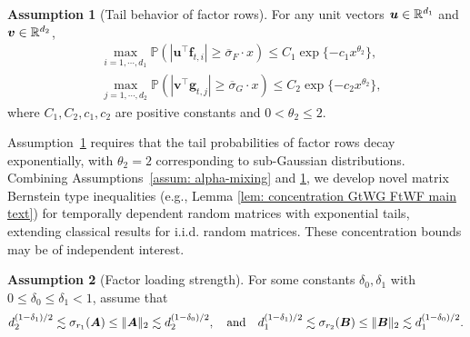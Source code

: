 \documentclass[11pt,letterpaper]{article}
\newcommand{\bfm}[1]{\ensuremath{\boldsymbol{#1}}} %
\def\bg{\bfm g}   \def\bG{\bfm G}  \def\GG{\mathbb{G}}
\def\bu{\bfm u}   \def\bU{\bfm U}  \def\UU{\mathbb{U}}
\def\bv{\bfm v}   \def\bV{\bfm V}  \def\VV{\mathbb{V}}
\theoremstyle{definition}
\newtheorem{assumption}{Assumption}
\newcommand{\bfv}{\mathbf{f}}
\begin{document}
\begin{assumption}[Tail behavior of factor rows]
\label{assum: factor tail bound}
For any unit vectors $\bu \in \RR^{d_1}$ and $\bv \in \RR^{d_2}$,
\begin{align*}
&\max_{i=1, \cdots, d_1} \mathbb{P} \left( \left|\bu^\top \bfv_{t, i} \right| \geq \overline{\sigma}_{F} \cdot x \right) \le C_1 \exp \{-c_1 x^{\theta_2} \},    \\
&\max_{j=1, \cdots, d_2} \mathbb{P} \left( \left|\bv^\top \bg_{t, j} \right| \geq \overline{\sigma}_{G} \cdot x \right) \le C_2 \exp \{-c_2 x^{\theta_2} \},    
\end{align*}
where $C_1, C_2, c_1, c_2$ are positive constants and $0 < \theta_2 \le 2$.
\end{assumption}



Assumption~\ref{assum: factor tail bound} requires that the tail probabilities of factor rows decay exponentially, with $\theta_2=2$ corresponding to sub-Gaussian distributions. Combining Assumptions~\ref{assum: alpha-mixing} and \ref{assum: factor tail bound}, we develop novel matrix Bernstein type inequalities (e.g., Lemma \ref{lem: concentration GtWG FtWF main text}) for temporally dependent random matrices with exponential tails, extending classical results for i.i.d. random matrices. These concentration bounds may be of independent interest.




\begin{assumption}[Factor loading strength]
\label{assum: loading matrices scaling}
For some constants $\delta_0, \delta_1$ with $0 \le \delta_0 \le \delta_1 < 1$, assume that
\begin{align*}
d_2^{(1-\delta_1)/2} \lesssim \sigma_{r_1}(\bA) \le \|\bA\|_2 \lesssim d_2^{(1-\delta_0)/2},\quad\text{and}\quad d_1^{(1-\delta_1)/2} \lesssim \sigma_{r_2}(\bB) \le \|\bB\|_2 \lesssim d_1^{(1-\delta_0)/2}.    
\end{align*}

\end{assumption}
\end{document}
